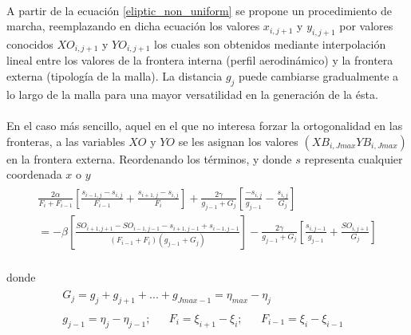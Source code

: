 \documentclass[letterpaper, openright, 12pt]{book}
\begin{document}
	\paragraph*{}
		A partir de la ecuación \ref{eliptic_non_uniform} se propone un procedimiento de marcha, reemplazando en dicha ecuación los valores $x_{i, j + 1}$ y $y_{i, j+1}$ por valores conocidos $XO_{i, j + 1}$ y $YO_{i, j + 1}$ los cuales son obtenidos mediante interpolación lineal entre los valores de la frontera interna (perfil aerodinámico) y la frontera externa (tipología de la malla). La distancia $g_j$ puede cambiarse gradualmente a lo largo de la malla para una mayor versatilidad en la generación de la ésta.
		
	\paragraph*{}
		En el caso más sencillo, aquel en el que no interesa forzar la ortogonalidad en las fronteras, a las variables $XO$ y $YO$ se les asignan los valores $(XB_{i, Jmax} YB_{i, Jmax})$ en la frontera externa. Reordenando los términos, y donde $s$ representa cualquier coordenada $x$ o $y$\\
		\begin{align}
			\begin{aligned}
			\frac{2\alpha}{F_i + F_{i - 1}} \left[ \frac{s_{i-1, j} - s_{i, j}}{F_{i - 1}} + \frac{s_{i+1, j} - s_{i, j}}{F_i} \right] + \frac{2\gamma}{g_{j - 1} + G_j} \left[ \frac{-s_{i, j}}{g_{j - 1}} - \frac{s_{i, j}}{G_j} \right]\\
			= -\beta \left[ \frac{ SO_{i+1, j+1} - SO_{i-1, j-1} - s_{i+1, j-1} + s_{i-1, j-1} }{ (F_{i - 1} + F_i) (g_{j - 1} + G_j) } \right] - \frac{2\gamma}{g_{j-1} + G_j} \left[ \frac{s_{i, j - 1}}{g_{j - 1}} + \frac{SO_{i, j + 1}}{G_j} \right]
			\end{aligned}
			\label{eliptic_non_uniform1}
		\end{align}\\
		donde
		\begin{align*}
			&\begin{aligned}
			G_j = g_j + g_{j + 1} + ... + g_{Jmax - 1} = \eta_{max} - \eta_j
			\end{aligned}\\
			&\begin{aligned}
			g_{j - 1} = \eta_j - \eta_{j - 1};&& F_i = \xi_{i + 1} - \xi_i; && F_{i - 1} = \xi_i - \xi_{i - 1}&&
			\end{aligned}
		\end{align*}\\
\end{document}
